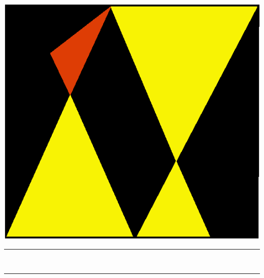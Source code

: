 \documentclass[12pt, landscape]{amsart}
\begin{document}
\begin{minipage}{.15\textheight}
\vspace*{.5cm}
\begin{flushright}
\includegraphics[scale=.4]{matematicas}
\end{flushright}
\end{minipage}
\begin{center} \color{miotroazul}
\rule{0.7\textwidth}{2px}\\[-3px]\rule{0.6\textwidth}{2px}
\end{center}
\vspace{1cm}
\end{document}

